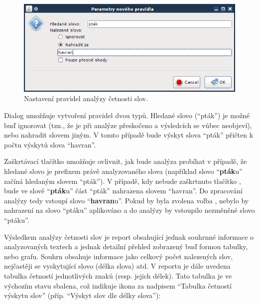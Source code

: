 \documentclass[dp.tex]{subfiles}
\begin{document}
\begin{figure}[H]
\centering
\includegraphics[max width=\textwidth,keepaspectratio=true]{imgs-60-aplikace/gui-word-analysis-rules-dialog}
\caption{Nastavení pravidel analýzy četnosti slov.}
\label{fig:gui-word-analysis-rules-dialog}
\end{figure}

Dialog umožňuje vytvoření pravidel dvou typů. Hledané slovo (\enquote{pták}) je možné buď ignorovat (tzn., že je při analýze přeskočeno a výsledcích se vůbec neobjeví), nebo nahradit slovem jiným. V tomto případě bude výskyt slova \enquote{pták} přičten k počtu výskytů slova \enquote{havran}.

Zaškrtávací tlačítko  umožňuje ovlivnit, jak bude analýza probíhat v případě, že hledané slovo je prefixem právě analyzovaného slova (například slovo \enquote{\textbf{pták}u} začíná hledaným slovem \enquote{pták}). V případě, kdy nebude zaškrtnuto tlačítko , bude ve slově \enquote{\textbf{pták}u} část \enquote{pták} nahrazena slovem \enquote{havran}. Do zpracování analýzy tedy vstoupí slovo \enquote{\textbf{havran}u}. Pokud by byla zvolena volba , nebylo by nahrazení na slovo \enquote{ptáku} aplikováno a do analýzy by vstoupilo nezměněné slovo \enquote{ptáku}.


Výsledkem analýzy četnosti slov je report obsahující jednak souhrnné informace o analyzovaných textech a jednak detailní přehled zobrazený buď formou tabulky, nebo grafu. Souhrn obsahuje informace jako celkový počet nalezených slov, nejčastěji se vyskytující slovo (délka slova) atd. V reportu je dále uvedena tabulka četností jednotlivých znaků (resp. jejich délek). Tato tabulka je ve výchozím stavu sbalena, což indikuje ikona za nadpisem \enquote{Tabulka četností výskytu slov} (příp. \enquote{Výskyt slov dle délky slova}):
\end{document}
